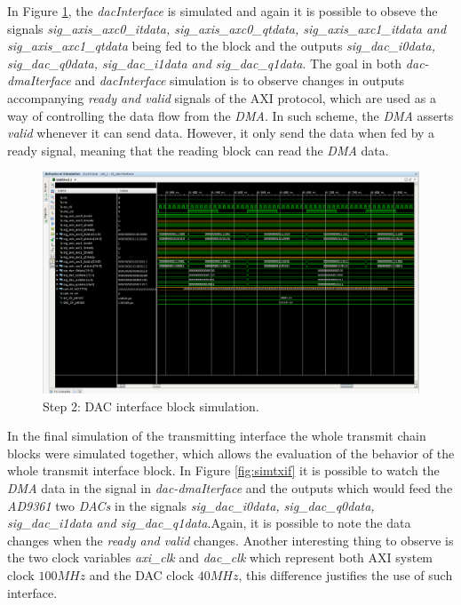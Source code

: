  In Figure \ref{fig:simdac}, the \textit{dacInterface} is simulated and again it
 is possible to obseve the signals \textit{sig\_axis\_axc0\_itdata,
 sig\_axis\_axc0\_qtdata, sig\_axis\_axc1\_itdata and sig\_axis\_axc1\_qtdata}
 being fed to the block and the outputs \textit{sig\_dac\_i0data,
 sig\_dac\_q0data, sig\_dac\_i1data and sig\_dac\_q1data}. The goal in both
 \textit{dac-dmaIterface} and \textit{dacInterface} simulation is to observe
 changes in outputs accompanying \textit{ready and valid} signals of the AXI
 protocol, which are used as a way of controlling the data flow from the
 \textit{DMA}. In such scheme, the \textit{DMA} asserts \textit{valid} whenever
 it can send data. However, it only send the data when fed by a ready signal,
 meaning that the reading block can read the \textit{DMA} data.

\begin{figure}[htbp]
    \centering
    \includegraphics[height=.4\textwidth, width=1\textwidth,
    trim={{.13\textwidth} {.8\textwidth} {.05\textwidth} {.15\textwidth}},
    clip]{./figures/dacInterface}
    \caption{ Step 2: DAC interface block simulation.
    \label{fig:simdac}}
\end{figure}

In the final simulation of the transmitting interface the whole transmit chain
blocks were simulated together, which allows the evaluation of the behavior of
the whole transmit interface block. In Figure \ref{fig:simtxif} it is possible
to watch the \textit{DMA} data in the signal in \textit{dac-dmaIterface} and the
outputs which would feed the \textit{AD9361} two \textit{DACs} in the signals
\textit{sig\_dac\_i0data, sig\_dac\_q0data, sig\_dac\_i1data and
sig\_dac\_q1data}.Again, it is possible to note the data changes when the
\textit{ready and valid} changes. Another interesting thing to observe is the
two clock variables \textit{axi\_clk} and \textit{dac\_clk} which represent both
AXI system clock $ 100 MHz$ and the DAC clock $40 MHz$, this difference
justifies the use of such interface.


